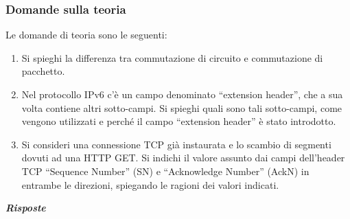 \documentclass[a4paper]{article}
\newcommand{\dquotes}[1]{``#1''}
\begin{document}
	\subsubsection{Domande sulla teoria}
	Le domande di teoria sono le seguenti:
	\begin{enumerate}
		\item Si spieghi la differenza tra commutazione di circuito e commutazione di pacchetto.
		
		\item Nel protocollo IPv6 c'è un campo denominato \dquotes{extension header}, che a sua volta contiene altri sotto-campi. Si spieghi quali sono tali sotto-campi, come vengono utilizzati e perché il campo \dquotes{extension header} è stato introdotto.
		
		\item Si consideri una connessione TCP già instaurata e lo scambio di segmenti dovuti ad una HTTP GET. Si indichi il valore assunto dai campi dell'header TCP \dquotes{Sequence Number} (SN) e \dquotes{Acknowledge Number} (AckN) in entrambe le direzioni, spiegando le ragioni dei valori indicati.
	\end{enumerate}
	\textcolor{Green4}{\textbf{\emph{Risposte}}}
\end{document}
